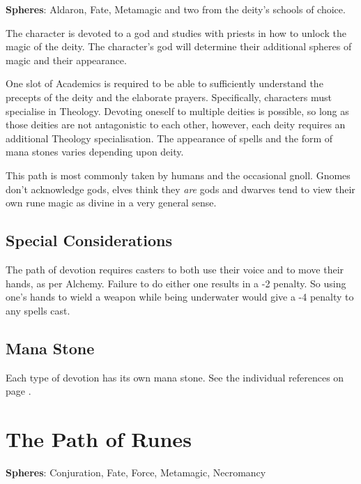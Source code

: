 \begin{multicols}{2}

\textbf{Spheres}: Aldaron, Fate, Metamagic and two from the deity's schools of choice.

\noindent The character is devoted to a god and studies with priests in how to unlock the magic of the deity. The character's god will determine their additional spheres of magic and their appearance.

One slot of Academics is required to be able to sufficiently understand the precepts of the deity and the elaborate prayers. Specifically, characters must specialise in Theology. Devoting oneself to multiple deities is possible, so long as those deities are not antagonistic to each other, however, each deity requires an additional Theology specialisation. The appearance of spells and the form of mana stones varies depending upon deity.

This path is most commonly taken by humans and the occasional gnoll. Gnomes don't acknowledge gods, elves think they \emph{are} gods and dwarves tend to view their own rune magic as divine in a very general sense.

\subsection{Special Considerations}

The path of devotion requires casters to both use their voice and to move their hands, as per Alchemy. Failure to do either one results in a -2 penalty. So using one's hands to wield a weapon while being underwater would give a -4 penalty to any spells cast.

\subsection{Mana Stone}

Each type of devotion has its own mana stone.  See the individual references on page \pageref{gods_codes}.

\end{multicols}

\section{The Path of Runes}

\textbf{Spheres}: Conjuration, Fate, Force, Metamagic, Necromancy

